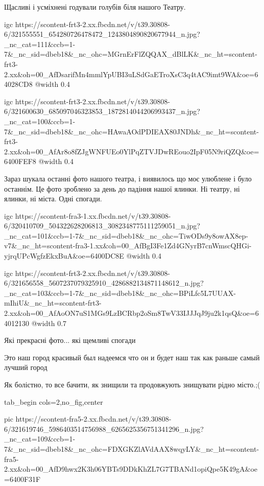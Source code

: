 
Щасливі і усміхнені годували голубів біля нашого Театру.

\ifcmt
  igc https://scontent-frt3-2.xx.fbcdn.net/v/t39.30808-6/321555551_654280726478472_1243804890820677944_n.jpg?_nc_cat=111&ccb=1-7&_nc_sid=dbeb18&_nc_ohc=MGrnErFlZQQAX_dBlLK&_nc_ht=scontent-frt3-2.xx&oh=00_AfDsarifMn4mmlYpUBI3uLSdGaETroXsC3q4tAC9imt9WA&oe=64028CD8
	@width 0.4
\fi


\ifcmt
  igc https://scontent-frt3-2.xx.fbcdn.net/v/t39.30808-6/321600630_685097046323853_1872814044206993437_n.jpg?_nc_cat=100&ccb=1-7&_nc_sid=dbeb18&_nc_ohc=HAwaAOdPDIEAX80JNDh&_nc_ht=scontent-frt3-2.xx&oh=00_AfAr8o8fZJgWNFUEo0YlPqZTVJDwREouo2IpF05N9riQZQ&oe=6400FEF8
	@width 0.4
\fi


Зараз шукала останні фото нашого театра, і виявилось що моє улюблене і було
останнім. Це фото зроблено за день до падіння нашої ялинки. Ні театру, ні
ялинки, ні міста. Одні спогади.

\ifcmt
  igc https://scontent-fra3-1.xx.fbcdn.net/v/t39.30808-6/320410709_504322628206813_3082348775111259051_n.jpg?_nc_cat=101&ccb=1-7&_nc_sid=dbeb18&_nc_ohc=TiwODs9y8owAX8ep-v7&_nc_ht=scontent-fra3-1.xx&oh=00_AfBgI3Fe1Zd4GNyrB7cnWmscQHGi-yjrqUPcWgfzEkxBuA&oe=6400DC8E
	@width 0.4
\fi


\ifcmt
  igc https://scontent-frt3-2.xx.fbcdn.net/v/t39.30808-6/321656558_5607237079325910_4286882134871148612_n.jpg?_nc_cat=103&ccb=1-7&_nc_sid=dbeb18&_nc_ohc=BPiLfc5L7UUAX-mIhiU&_nc_ht=scontent-frt3-2.xx&oh=00_AfAoON7uS1MGs9LzBCRbp2oSm8TwV33IJJJqJ9ju2k1qsQ&oe=64012130
	@width 0.7
\fi


Які прекрасні фото... які щемливі спогади


Это наш город красивый был надеемся что он и будет наш так как раньше самый лучший город


Як болістно, то все бачити, як знищили та продовжують знищувати рідно місто.;(


\ifcmt
  tab_begin cols=2,no_fig,center

     pic https://scontent-fra5-2.xx.fbcdn.net/v/t39.30808-6/321619746_5986403514756988_6265625356751341296_n.jpg?_nc_cat=109&ccb=1-7&_nc_sid=dbeb18&_nc_ohc=FDXGKZlAVdAAX8wqyLY&_nc_ht=scontent-fra5-2.xx&oh=00_AfD9hwx2K3h06YBTs9DDkKhZL7G7TBANd1opiQpe5K49gA&oe=6400F31F

